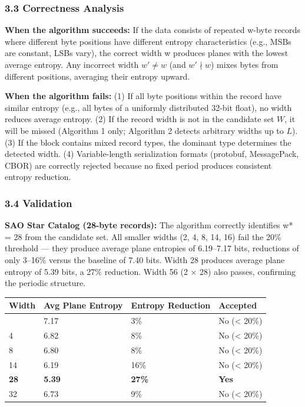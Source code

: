 \documentclass[
  11pt,
  letterpaper,
]{article}
\makeatletter
\renewcommand{\_}{\bpd@origunderscore\allowbreak}
\makeatother
\begin{document}
\hypertarget{correctness-analysis}{%
\subsubsection{3.3 Correctness Analysis}\label{correctness-analysis}}

\textbf{When the algorithm succeeds:} If the data consists of repeated
w-byte records where different byte positions have different entropy
characteristics (e.g., MSBs are constant, LSBs vary), the correct width
w produces planes with the lowest average entropy. Any incorrect width
\(w' \ne w\) (and \(w' \nmid w\)) mixes bytes from different positions,
averaging their entropy upward.

\textbf{When the algorithm fails:} (1) If all byte positions within the
record have similar entropy (e.g., all bytes of a uniformly distributed
32-bit float), no width reduces average entropy. (2) If the record width
is not in the candidate set \(W\), it will be missed (Algorithm 1 only;
Algorithm 2 detects arbitrary widths up to \(L\)). (3) If the block
contains mixed record types, the dominant type determines the detected
width. (4) Variable-length serialization formats (protobuf, MessagePack,
CBOR) are correctly rejected because no fixed period produces consistent
entropy reduction.

\hypertarget{validation}{%
\subsubsection{3.4 Validation}\label{validation}}

\textbf{SAO Star Catalog (28-byte records):} The algorithm correctly
identifies w* = 28 from the candidate set. All smaller widths (2, 4, 8,
14, 16) fail the 20\% threshold --- they produce average plane entropies
of 6.19--7.17 bits, reductions of only 3--16\% versus the baseline of
7.40 bits. Width 28 produces average plane entropy of 5.39 bits, a 27\%
reduction. Width 56 (2 × 28) also passes, confirming the periodic
structure.

\begin{longtable}[]{@{}llll@{}}
\toprule\noalign{}
Width & Avg Plane Entropy & Entropy Reduction & Accepted \\
\midrule\noalign{}
\endhead
\bottomrule\noalign{}
\endlastfoot
2 & 7.17 & 3\% & No (\textless{} 20\%) \\
4 & 6.82 & 8\% & No (\textless{} 20\%) \\
8 & 6.80 & 8\% & No (\textless{} 20\%) \\
14 & 6.19 & 16\% & No (\textless{} 20\%) \\
\textbf{28} & \textbf{5.39} & \textbf{27\%} & \textbf{Yes} \\
32 & 6.73 & 9\% & No (\textless{} 20\%) \\
\end{longtable}
\end{document}
